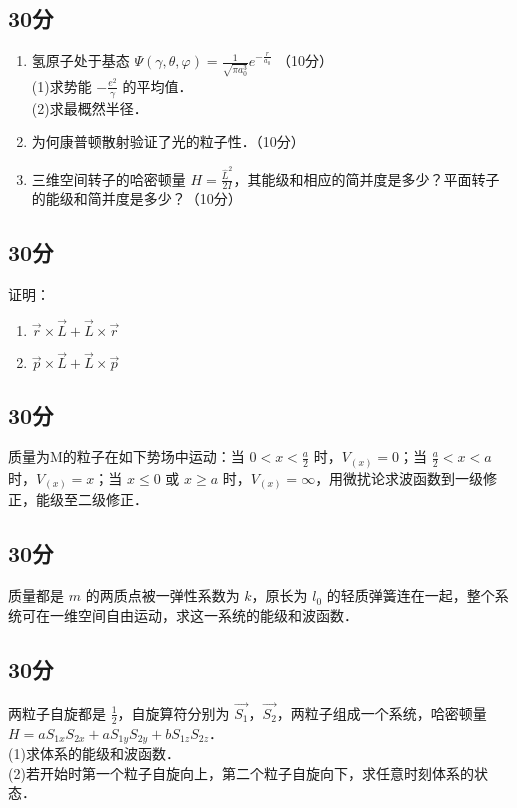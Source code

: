 
\subsection{30分}
\begin{enumerate}
\item 氢原子处于基态 $\varPsi(\gamma,\theta,\varphi)=\frac{1}{\sqrt{\pi a^{3}_{0}}}e^{-\frac{r}{a_0}}$ （10分）\\
(1)求势能 $-\frac{e^2}{\gamma}$ 的平均值．\\
(2)求最概然半径．\\
\item 为何康普顿散射验证了光的粒子性．（10分）\\
\item 三维空间转子的哈密顿量 $H=\frac{\hat{L}^2}{2I}$，其能级和相应的简并度是多少？平面转子的能级和简并度是多少？（10分）\\
\end{enumerate}
\subsection{30分}
证明：\\
\begin{enumerate}
\item $\vec{r}\times \vec{L}+ \vec{L}\times \vec{r}$
\item $\vec{p}\times\vec{L}+\vec{L}\times\vec{p}$
\end{enumerate}
\subsection{30分}
质量为M的粒子在如下势场中运动：当 $0<x<\frac{a}{2}$ 时，$V_{(x)}=0$；当 $\frac{a}{2} <x<a$ 时，$V_{(x)}=x$；当 $x \le 0$ 或 $x \ge a$ 时，$V_{(x)}=\infty$，用微扰论求波函数到一级修正，能级至二级修正．
\subsection{30分}
质量都是 $m$ 的两质点被一弹性系数为 $k$，原长为 $l_{0}$ 的轻质弹簧连在一起，整个系统可在一维空间自由运动，求这一系统的能级和波函数．
\subsection{30分}
两粒子自旋都是 $\frac{1}{2}$，自旋算符分别为 $\vec{S_{1}}$，$\vec{S_{2}}$，两粒子组成一个系统，哈密顿量 $H=aS_{1x}S_{2x}+aS_{1y}S_{2y}+bS_{1z}S_{2z}$．\\
(1)求体系的能级和波函数．\\
(2)若开始时第一个粒子自旋向上，第二个粒子自旋向下，求任意时刻体系的状态．\\